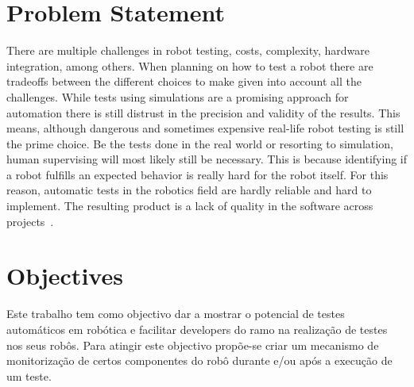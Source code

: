 \section{Problem Statement}
\label{sec:problem}

There are multiple challenges in robot testing, costs, 
complexity, hardware integration, among others.
When planning on how to test a robot there are tradeoffs between the 
different choices to make given into account all the challenges.
While tests using simulations are a promising approach for automation 
there is still distrust in the precision and validity of the results.
This means, although dangerous and sometimes expensive real-life 
robot testing is still the prime choice.
Be the tests done in the real world or resorting to simulation, 
human supervising will most likely still be necessary.
This is because identifying if a robot fulfills an expected 
behavior is really hard for the robot itself.
For this reason, automatic tests in the robotics field are 
hardly reliable and hard to implement.
The resulting product is a lack of quality in the software across projects~\cite{TestRob}.

\section{Objectives}
\label{sec:objectives}

Este trabalho tem como objectivo dar a mostrar o potencial de testes automáticos em robótica e facilitar 
developers do ramo na realização de testes nos seus robôs. Para atingir este objectivo propõe-se criar 
um mecanismo de monitorização de certos componentes do robô durante e/ou após a execução de um teste. 


